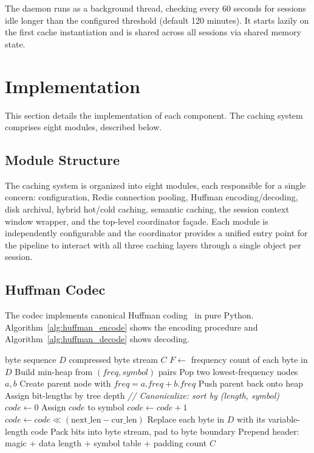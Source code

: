 \documentclass[conference]{IEEEtran}
\begin{document}
The daemon runs as a background thread, checking every 60 seconds for sessions idle longer than the configured threshold (default 120 minutes). It starts lazily on the first cache instantiation and is shared across all sessions via shared memory state.


\section{Implementation}
\label{sec:implementation}

This section details the implementation of each component. The caching system comprises eight modules, described below.

\subsection{Module Structure}

The caching system is organized into eight modules, each responsible for a single concern: configuration, Redis connection pooling, Huffman encoding/decoding, disk archival, hybrid hot/cold caching, semantic caching, the session context window wrapper, and the top-level coordinator fa\c{c}ade. Each module is independently configurable and the coordinator provides a unified entry point for the pipeline to interact with all three caching layers through a single object per session.

\subsection{Huffman Codec}

The codec implements canonical Huffman coding~\cite{huffman1952} in pure Python. Algorithm~\ref{alg:huffman_encode} shows the encoding procedure and Algorithm~\ref{alg:huffman_decode} shows decoding.

\begin{algorithm}[h]
\caption{Canonical Huffman Encoding}
\label{alg:huffman_encode}
\begin{algorithmic}[1]
\REQUIRE byte sequence $D$
\ENSURE compressed byte stream $C$
\STATE $F \leftarrow$ frequency count of each byte in $D$
\STATE Build min-heap from $(freq, symbol)$ pairs
  \STATE Pop two lowest-frequency nodes $a, b$
  \STATE Create parent node with $freq = a.freq + b.freq$
  \STATE Push parent back onto heap
\ENDWHILE
\STATE Assign bit-lengths by tree depth
\STATE \textit{// Canonicalize: sort by (length, symbol)}
\STATE $code \leftarrow 0$
  \STATE Assign $code$ to symbol
  \STATE $code \leftarrow code + 1$
    \STATE $code \leftarrow code \ll (\text{next\_len} - \text{cur\_len})$
  \ENDIF
\ENDFOR
\STATE Replace each byte in $D$ with its variable-length code
\STATE Pack bits into byte stream, pad to byte boundary
\STATE Prepend header: magic + data length + symbol table + padding count
\RETURN $C$
\end{algorithmic}
\end{algorithm}
\end{document}
